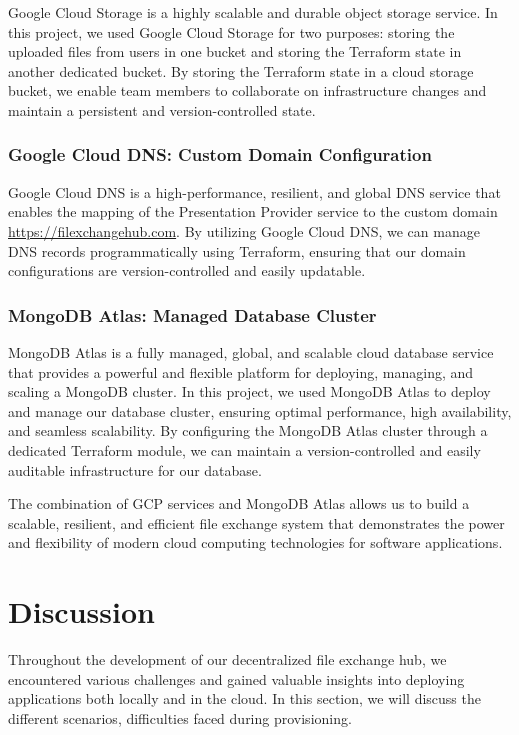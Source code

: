 \documentclass[a4paper,fleqn]{cas-sc}
\begin{document}
Google Cloud Storage is a highly scalable and durable object storage service. In this project, we used Google Cloud Storage for two purposes: storing the uploaded files from users in one bucket and storing the Terraform state in another dedicated bucket. By storing the Terraform state in a cloud storage bucket, we enable team members to collaborate on infrastructure changes and maintain a persistent and version-controlled state.

\subsubsection{Google Cloud DNS: Custom Domain Configuration}

Google Cloud DNS is a high-performance, resilient, and global DNS service that enables the mapping of the Presentation Provider service to the custom domain \url{https://filexchangehub.com}. By utilizing Google Cloud DNS, we can manage DNS records programmatically using Terraform, ensuring that our domain configurations are version-controlled and easily updatable.

\subsubsection{MongoDB Atlas: Managed Database Cluster}

MongoDB Atlas is a fully managed, global, and scalable cloud database service that provides a powerful and flexible platform for deploying, managing, and scaling a MongoDB cluster. In this project, we used MongoDB Atlas to deploy and manage our database cluster, ensuring optimal performance, high availability, and seamless scalability. By configuring the MongoDB Atlas cluster through a dedicated Terraform module, we can maintain a version-controlled and easily auditable infrastructure for our database.

The combination of GCP services and MongoDB Atlas allows us to build a scalable, resilient, and efficient file exchange system that demonstrates the power and flexibility of modern cloud computing technologies for software applications.

\section{Discussion} \label{sec:discussion}

Throughout the development of our decentralized file exchange hub, we encountered various challenges and gained valuable insights into deploying applications both locally and in the cloud. In this section, we will discuss the different scenarios, difficulties faced during provisioning.
\end{document}
